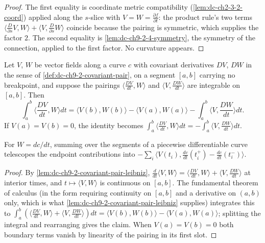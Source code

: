 \begin{proof}

  \sketch
  The first equality is coordinate metric compatibility (\cref{lem:dc-ch2-3-2-coord})
  applied along the $s$-slice with $V=W=\frac{\partial f}{\partial t}$: the product rule's
  two terms $\langle\frac{D}{\partial s}V,W\rangle+\langle V,\frac{D}{\partial s}W\rangle$
  coincide because the pairing is symmetric, which supplies the factor $2$. The second
  equality is \cref{lem:dc-ch9-2-4-symmetry}, the symmetry of the connection, applied to
  the first factor. No curvature appears.
\end{proof}
\begin{lemma}
  \label{lem:dc-ch9-2-4-parts}


  Let $V$, $W$ be vector fields along a curve $c$ with covariant derivatives $DV$, $DW$
  in the sense of \cref{def:dc-ch9-2-covariant-pair}, on a segment $[a,b]$ carrying no
  breakpoint, and suppose the pairings $\langle\frac{DV}{dt},W\rangle$ and
  $\langle V,\frac{DW}{dt}\rangle$ are integrable on $[a,b]$. Then
  $$
  \int_a^b\Big\langle\frac{DV}{dt},W\Big\rangle dt
    = \langle V(b),W(b)\rangle-\langle V(a),W(a)\rangle
      -\int_a^b\Big\langle V,\frac{DW}{dt}\Big\rangle dt.
  $$
  If $V(a)=V(b)=0$, the identity becomes
  $\int_a^b\langle\frac{DV}{dt},W\rangle dt=-\int_a^b\langle V,\frac{DW}{dt}\rangle dt$.

  For $W=dc/dt$, summing over the segments of a piecewise differentiable curve
  telescopes the endpoint contributions into
  $-\sum_i\langle V(t_i),\frac{dc}{dt}(t_i^+)-\frac{dc}{dt}(t_i^-)\rangle$.
\end{lemma}
\begin{proof}

  \sketch
  By \cref{lem:dc-ch9-2-covariant-pair-leibniz}, $\frac{d}{dt}\langle V,W\rangle
  =\langle\frac{DV}{dt},W\rangle+\langle V,\frac{DW}{dt}\rangle$ at interior times, and
  $t\mapsto\langle V,W\rangle$ is continuous on $[a,b]$. The fundamental theorem of
  calculus (in the form requiring continuity on $[a,b]$ and a derivative on $(a,b)$ only,
  which is what \cref{lem:dc-ch9-2-covariant-pair-leibniz} supplies) integrates this to
  $\int_a^b(\langle\frac{DV}{dt},W\rangle+\langle V,\frac{DW}{dt}\rangle)dt
  =\langle V(b),W(b)\rangle-\langle V(a),W(a)\rangle$; splitting the integral and
  rearranging gives the claim. When $V(a)=V(b)=0$ both boundary terms vanish by linearity
  of the pairing in its first slot.
\end{proof}
